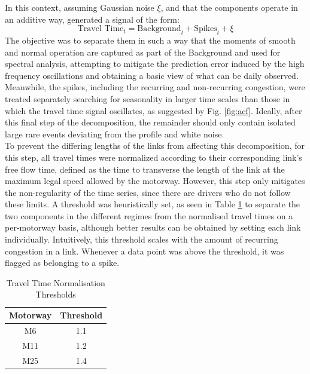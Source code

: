 \documentclass[letterpaper, 10 pt, conference]{ieeeconf}  %
\begin{document}

In this context, assuming Gaussian noise $\xi$, and that the components operate in an additive way, generated a signal of the form:
\begin{equation}
\textrm{Travel Time}_t  = \textrm{Background}_t + \textrm{Spikes}_t + \xi
\end{equation}
The objective was to separate them in such a way that the moments of smooth and normal operation are captured as part of the Background and used for spectral analysis, attempting to mitigate the prediction error induced by the high frequency oscillations and obtaining a basic view of what can be daily observed.
Meanwhile, the spikes, including the recurring and non-recurring congestion, were treated separately searching for seasonality in larger time scales than those in which the travel time signal oscillates, as suggested by Fig. \ref{fig:acf}. 
Ideally, after this final step of the decomposition, the remainder should only contain isolated large rare events deviating from the profile and white noise.\\

To prevent the differing lengths of the links from affecting this decomposition, for this step, all travel times were normalized according to their corresponding link's free flow time, defined as the time to transverse the length of the link at the maximum legal speed allowed by the motorway. 
However, this step only mitigates the non-regularity of the time series, since there are drivers who do not follow these limits.
A threshold was heuristically set, as seen in Table \ref{table:threshold}  to separate the two components in the different regimes from the normalised travel times on a per-motorway basis, although better results can be obtained by setting each link individually. 
Intuitively, this threshold scales with the amount of recurring congestion in a link. Whenever a data point was above the threshold, it was flagged as belonging to a spike.
\begin{table}[htbp]
	\caption{Travel Time Normalisation Thresholds}
	\begin{center}
		\begin{tabular}{|c|c|}
			\hline
			\textbf{Motorway}&{\textbf{Threshold}} \\
			\hline
			M6& 1.1\\
			\hline
			M11& 1.2\\
			\hline
			M25& 1.4\\
			\hline
		\end{tabular}
		\label{table:threshold}
	\end{center}
\end{table}
\end{document}
